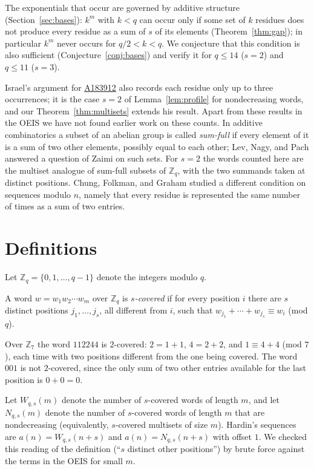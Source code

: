 \documentclass[12pt,reqno]{article}
\newcommand{\seqnum}[1]{\href{https://oeis.org/#1}{\rm \underline{#1}}}
\newcommand{\Zq}{\mathbb{Z}_q}
\begin{document}
The exponentials that occur are governed by additive structure
(Section~\ref{sec:bases}): $k^m$ with $k < q$ can occur only if some set of
$k$ residues does not produce every residue as a sum of $s$ of its elements
(Theorem~\ref{thm:gap}); in particular $k^m$ never occurs for $q/2 < k < q$.
We conjecture that this condition is also sufficient
(Conjecture~\ref{conj:bases}) and verify it for $q \le 14$ ($s = 2$) and
$q \le 11$ ($s = 3$).

Israel's argument for \seqnum{A183912} also records each residue only up to
three occurrences; it is the case $s = 2$ of Lemma~\ref{lem:profile} for
nondecreasing words, and our Theorem~\ref{thm:multisets} extends his result.
Apart from these results in the OEIS we have not found earlier work on these
counts. In additive combinatorics a
subset of an abelian group is called \emph{sum-full} if every element of it is
a sum of two other elements, possibly equal to each other; Lev, Nagy, and Pach
\cite{lnp} answered a question of Zaimi on such sets. For $s = 2$ the words
counted here are the multiset analogue of sum-full subsets of $\Zq$, with the
two summands taken at distinct positions. Chung, Folkman, and Graham
\cite{cfg} studied a different condition on sequences modulo $n$, namely that
every residue is represented the same number of times as a sum of two entries.

\section{Definitions}\label{sec:defs}

Let $\Zq = \{0, 1, \ldots, q-1\}$ denote the integers modulo $q$.

\begin{definition}
A word $w = w_1 w_2 \cdots w_m$ over $\Zq$ is \emph{$s$-covered} if for every
position $i$ there are $s$ distinct positions $j_1, \ldots, j_s$, all
different from $i$, such that $w_{j_1} + \cdots + w_{j_s} \equiv w_i$ (mod $q$).
\end{definition}

\begin{example}
Over $\mathbb{Z}_7$ the word $112244$ is $2$-covered: $2 = 1 + 1$,
$4 = 2 + 2$, and $1 \equiv 4 + 4$ (mod $7$), each time with two positions
different from the one being covered. The word $001$ is not $2$-covered,
since the only sum of two other entries available for the last position is
$0 + 0 = 0$.
\end{example}

Let $W_{q,s}(m)$ denote the number of $s$-covered words of length $m$, and let
$N_{q,s}(m)$ denote the number of $s$-covered words of length $m$ that are
nondecreasing (equivalently, $s$-covered multisets of size $m$). Hardin's
sequences are $a(n) = W_{q,s}(n+s)$ and $a(n) = N_{q,s}(n+s)$ with offset $1$.
We checked this reading of the definition (``$s$ distinct other positions'')
by brute force against the terms in the OEIS for small $m$.
\end{document}
